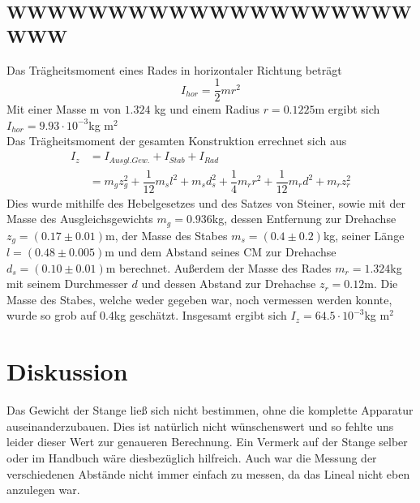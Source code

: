 \documentclass[12pt,a4paper,titlepage,headinclude,bibtotoc]{scrartcl}
\begin{document}
\subsection{WWWWWWWWWWWWWWWWWWWWWWW}
Das Trägheitsmoment eines Rades in horizontaler Richtung beträgt $$I_{hor}=\dfrac{1}{2}mr^2$$
Mit einer Masse m von $1.324$ kg und einem Radius $r=0.1225$m ergibt sich $I_{hor}=9.93\cdot 10^{-3}$kg m$^2$\\
Das Trägheitsmoment der gesamten Konstruktion errechnet sich aus
\begin{align}
I_z&=I_{Ausgl.Gew.}+I_{Stab}+I_{Rad}\\
&= m_gz_g^2+\dfrac{1}{12}m_sl^2+m_sd_s^2+\dfrac{1}{4}m_rr^2+\dfrac{1}{12}m_rd^2+m_rz_r^2
\end{align}
Dies wurde mithilfe des Hebelgesetzes und des Satzes von Steiner, sowie mit der Masse des Ausgleichsgewichts $m_g=0.936$kg, dessen Entfernung zur Drehachse $z_g=(0.17\pm 0.01)$m, der Masse des Stabes $m_s=(0.4\pm 0.2)$kg, seiner Länge $l=(0.48\pm 0.005)$m und dem Abstand seines CM zur Drehachse $d_s=(0.10\pm 0.01)$m berechnet. Außerdem der Masse des Rades $m_r=1.324$kg mit seinem Durchmesser $d$ und dessen Abstand zur Drehachse $z_r=0.12$m. Die Masse des Stabes, welche weder gegeben war, noch vermessen werden konnte, wurde so grob auf $0.4$kg geschätzt.
Insgesamt ergibt sich $I_z=64.5\cdot 10^{-3}$kg m$^2$





\section{Diskussion}
\label{sec:diskussion}
Das Gewicht der Stange ließ sich nicht bestimmen, ohne die komplette Apparatur auseinanderzubauen.
Dies ist natürlich nicht wünschenswert und so fehlte uns leider dieser Wert zur genaueren Berechnung.
Ein Vermerk auf der Stange selber oder im Handbuch wäre diesbezüglich hilfreich.
Auch war die Messung der verschiedenen Abstände nicht immer einfach zu messen, da das Lineal nicht eben anzulegen war.
\end{document}
